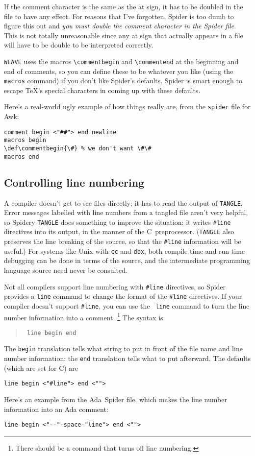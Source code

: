 If the comment character is the same as the at sign, it has to be
doubled in the {\WEB} file to have any effect.
For reasons that I've forgotten, {Spider} is too dumb
to figure this out and {\em you must double the comment character in
the {Spider} file}.
This is not totally unreasonable since any at sign that actually appears in a
{\WEB}  file will have to be double to be interpreted correctly.

{\tt WEAVE} uses the macros \verb+\commentbegin+ and
\verb+\commentend+ at the beginning and end of comments, so you can
define these to be whatever you like (using the {\tt macros} command)
if you don't like {Spider}'s defaults.
{Spider} is smart enough to escape {\TeX}'s special characters in
coming up with these defaults.

Here's a real-world ugly example of how things really are, from the
{\tt spider} file for Awk:
\begin{verbatim}
comment begin <"##"> end newline
macros begin
\def\commentbegin{\#} % we don't want \#\#
macros end
\end{verbatim}

\subsection{Controlling line numbering}
 A compiler doesn't get to see  {\WEB} files directly; it has to
read the output of {\tt TANGLE}.
Error messages labelled with line numbers from a tangled file aren't
very helpful, so  Spidery {\tt TANGLE} does something to improve the
situation: it writes {\tt \#line} directives into its output, in the
manner of the C~preprocessor.
({\tt TANGLE} also preserves the line breaking of the {\WEB} source,
so that the {\tt \#line} information will be useful.)
For systems like Unix with {\tt cc} and {\tt dbx}, both compile-time
and run-time debugging can be done in terms of the {\WEB} source, and
the intermediate programming language source need never be consulted.

Not all compilers support line numbering with {\tt \#line} directives,
so {Spider} provides a {\tt line} command to change the format of
the {\tt \#line} directives.
If your compiler doesn't support {\tt \#line}, you can use the {\tt
line} command to turn the line number information into a comment.%
\footnote{%
There should be a command that turns off line numbering.%
}
The syntax is:
\begin{quote}
\tt
line begin  end 
\end{quote}
The {\tt begin} translation tells what string to put in front of the file
name and line number information; the {\tt end} translation tells what to
put afterward.
The defaults (which are set for C) are
\begin{verbatim}
line begin <"#line"> end <"">
\end{verbatim}
Here's an example from the Ada~{Spider} file, which makes the line
number information into an Ada comment:
\begin{verbatim}
line begin <"--"-space-"line"> end <"">
\end{verbatim}




